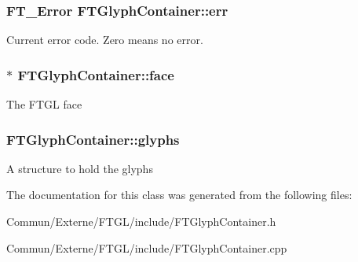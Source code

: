 \subsubsection[{\texorpdfstring{err}{err}}]{\setlength{\rightskip}{0pt plus 5cm}F\+T\+\_\+\+Error F\+T\+Glyph\+Container\+::err\hspace{0.3cm}{\ttfamily [private]}}\hypertarget{class_f_t_glyph_container_a090090b898be4cf4301e6c098429cead}{}\label{class_f_t_glyph_container_a090090b898be4cf4301e6c098429cead}
Current error code. Zero means no error. 
\subsubsection[{\texorpdfstring{face}{face}}]{$\ast$ F\+T\+Glyph\+Container\+::face\hspace{0.3cm}{\ttfamily [private]}}\hypertarget{class_f_t_glyph_container_afd28a78efbafe6f45e07766f538be143}{}\label{class_f_t_glyph_container_afd28a78efbafe6f45e07766f538be143}
The F\+T\+GL face 
\subsubsection[{\texorpdfstring{glyphs}{glyphs}}]{ F\+T\+Glyph\+Container\+::glyphs\hspace{0.3cm}{\ttfamily [private]}}\hypertarget{class_f_t_glyph_container_aeb09744c501786064b97a982247e78ff}{}\label{class_f_t_glyph_container_aeb09744c501786064b97a982247e78ff}
A structure to hold the glyphs 

The documentation for this class was generated from the following files\+:\begin{DoxyCompactItemize}
\item 
Commun/\+Externe/\+F\+T\+G\+L/include/F\+T\+Glyph\+Container.\+h\item 
Commun/\+Externe/\+F\+T\+G\+L/include/F\+T\+Glyph\+Container.\+cpp\end{DoxyCompactItemize}
